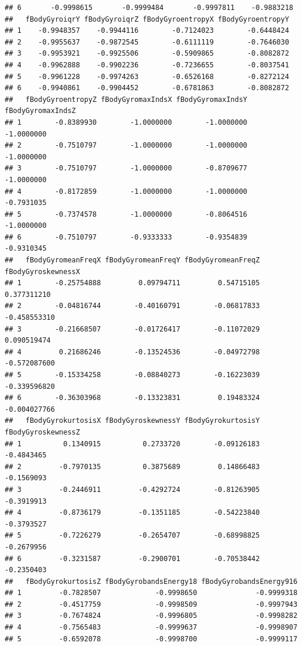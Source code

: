 \documentclass[
]{article}
\begin{document}
\begin{verbatim}
## 6       -0.9998615       -0.9999484       -0.9997811    -0.9883218
##   fBodyGyroiqrY fBodyGyroiqrZ fBodyGyroentropyX fBodyGyroentropyY
## 1    -0.9948357    -0.9944116        -0.7124023        -0.6448424
## 2    -0.9955637    -0.9872545        -0.6111119        -0.7646030
## 3    -0.9953921    -0.9925506        -0.5909865        -0.8082872
## 4    -0.9962888    -0.9902236        -0.7236655        -0.8037541
## 5    -0.9961228    -0.9974263        -0.6526168        -0.8272124
## 6    -0.9940861    -0.9904452        -0.6781863        -0.8082872
##   fBodyGyroentropyZ fBodyGyromaxIndsX fBodyGyromaxIndsY fBodyGyromaxIndsZ
## 1        -0.8389930        -1.0000000        -1.0000000        -1.0000000
## 2        -0.7510797        -1.0000000        -1.0000000        -1.0000000
## 3        -0.7510797        -1.0000000        -0.8709677        -1.0000000
## 4        -0.8172859        -1.0000000        -1.0000000        -0.7931035
## 5        -0.7374578        -1.0000000        -0.8064516        -1.0000000
## 6        -0.7510797        -0.9333333        -0.9354839        -0.9310345
##   fBodyGyromeanFreqX fBodyGyromeanFreqY fBodyGyromeanFreqZ fBodyGyroskewnessX
## 1        -0.25754888         0.09794711         0.54715105        0.377311210
## 2        -0.04816744        -0.40160791        -0.06817833       -0.458553310
## 3        -0.21668507        -0.01726417        -0.11072029        0.090519474
## 4         0.21686246        -0.13524536        -0.04972798       -0.572087600
## 5        -0.15334258        -0.08840273        -0.16223039       -0.339596820
## 6        -0.36303968        -0.13323831         0.19483324       -0.004027766
##   fBodyGyrokurtosisX fBodyGyroskewnessY fBodyGyrokurtosisY fBodyGyroskewnessZ
## 1          0.1340915          0.2733720        -0.09126183         -0.4843465
## 2         -0.7970135          0.3875689         0.14866483         -0.1569093
## 3         -0.2446911         -0.4292724        -0.81263905         -0.3919913
## 4         -0.8736179         -0.1351185        -0.54223840         -0.3793527
## 5         -0.7226279         -0.2654707        -0.68998825         -0.2679956
## 6         -0.3231587         -0.2900701        -0.70538442         -0.2350403
##   fBodyGyrokurtosisZ fBodyGyrobandsEnergy18 fBodyGyrobandsEnergy916
## 1         -0.7828507             -0.9998650              -0.9999318
## 2         -0.4517759             -0.9998509              -0.9997943
## 3         -0.7674824             -0.9996805              -0.9998282
## 4         -0.7565483             -0.9999637              -0.9998907
## 5         -0.6592078             -0.9998700              -0.9999117

\end{verbatim}
\end{document}
